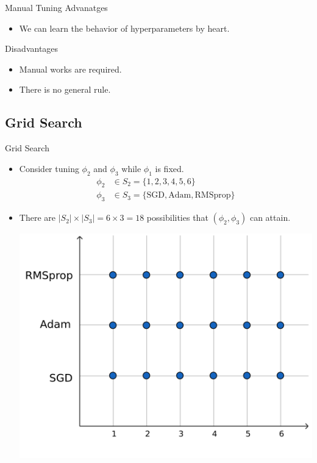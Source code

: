 \documentclass{beamer}
\begin{document}
%
\begin{frame}{Manual Tuning}
Advanatges
\begin{itemize}
\item
We can learn the behavior of hyperparameters by heart.
\end{itemize}
Disadvantages
\begin{itemize}
\item
Manual works are required.
\item
There is no general rule.
\end{itemize}
\end{frame}

\subsection{Grid Search}

%
\begin{frame}{Grid Search}
\begin{itemize}
\item
Consider tuning \(\phi_2\) and \(\phi_3\) while \(\phi_1\) is fixed.
\begin{align*}
\phi_2&\in S_2=\{1,2,3,4,5,6\}\\
\phi_3&\in S_3=\{\text{SGD},\text{Adam},\text{RMSprop}\}
\end{align*}
\item
There are \(|S_2|\times|S_3|=6\times 3=18\) possibilities that \((\phi_2,\phi_3)\) can attain.
\begin{center}
\includegraphics[width=.5\textwidth]{2_1_grid_2d}
\end{center}
\end{itemize}
\end{frame}
\end{document}
